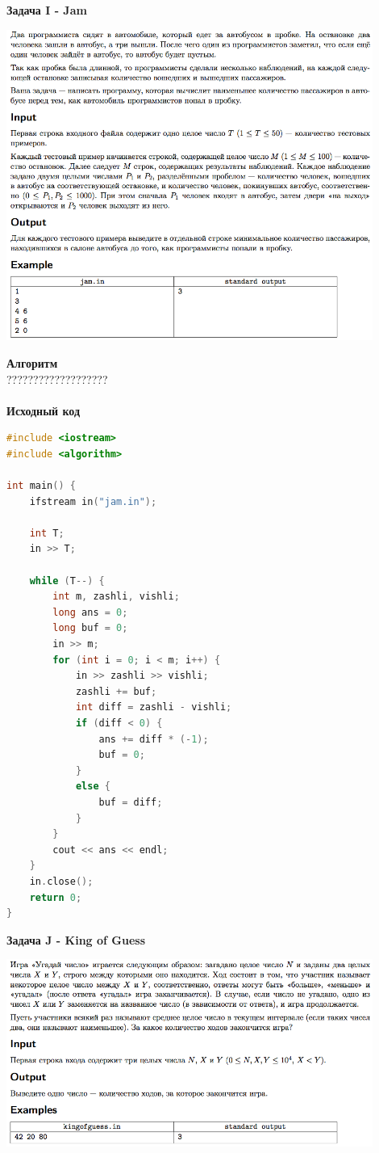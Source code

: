 \documentclass[a4paper,12pt]{article}
\begin{document}
\textbf{{\large Задача I - Jam}} \\
\begin{center}
\includegraphics[width=0.9\textwidth]{OC_Karelia/OC_Karelia_I.png}\\ [1cm]
\end{center}
\newpage

\textbf{{\large Алгоритм}} \\
{\Huge ???????????????????} \\ 
\\
\textbf{{\large Исходный код}}
\begin{lstlisting}[language=C++]
#include <iostream>
#include <algorithm>

int main() {
    ifstream in("jam.in");

    int T;
    in >> T;

    while (T--) {
        int m, zashli, vishli;
        long ans = 0;
        long buf = 0;
        in >> m;
        for (int i = 0; i < m; i++) {
            in >> zashli >> vishli;
            zashli += buf;
            int diff = zashli - vishli;
            if (diff < 0) {
                ans += diff * (-1);
                buf = 0;
            }
            else {
                buf = diff;
            }
        }
        cout << ans << endl;
    }
    in.close();
    return 0;
}
\end{lstlisting}

\textbf{{\large Задача J - King of Guess}} \\
\begin{center}
\includegraphics[width=0.9\textwidth]{OC_Karelia/OC_Karelia_J.png}\\ [1cm]
\end{center}
\newpage
\end{document}

